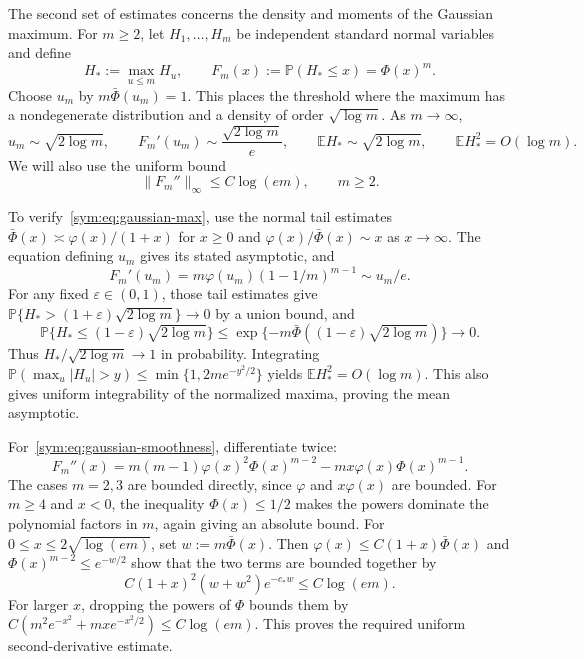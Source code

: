 \documentclass[11pt,letterpaper]{article}
\theoremstyle{remark}
\newcommand{\E}{\mathbb E}
\newcommand{\Pp}{\mathbb P}
\begin{document}
The second set of estimates concerns the density and moments of
the Gaussian maximum. For $m\ge2$, let $H_1,\ldots,H_m$ be
independent standard normal variables and define
\[
 H_*:=\max_{u\le m}H_u,\qquad F_m(x):=\Pp(H_*\le x)=\Phi(x)^m.
\]
Choose $u_m$ by $m\bar\Phi(u_m)=1$. This places the threshold
where the maximum has a nondegenerate distribution and a density
of order $\sqrt{\log m}$. As $m\to\infty$,
\begin{equation}
 u_m\sim\sqrt{2\log m},\qquad
 F_m'(u_m)\sim\frac{\sqrt{2\log m}}e,\qquad
 \E H_*\sim\sqrt{2\log m},\qquad \E H_*^2=O(\log m).
 \label{sym:eq:gaussian-max}
\end{equation}
We will also use the uniform bound
\begin{equation}
 \|F_m''\|_\infty\le C\log(em),\qquad m\ge2.
 \label{sym:eq:gaussian-smoothness}
\end{equation}

To verify~\eqref{sym:eq:gaussian-max}, use the normal tail estimates
$\bar\Phi(x)\asymp\varphi(x)/(1+x)$ for $x\ge0$ and
$\varphi(x)/\bar\Phi(x)\sim x$ as $x\to\infty$.
The equation defining $u_m$ gives its stated asymptotic, and
\[
 F_m'(u_m)=m\varphi(u_m)(1-1/m)^{m-1}
          \sim u_m/e.
\]
For any fixed $\varepsilon\in(0,1)$, those tail estimates
give $\Pp\{H_*>(1+\varepsilon)\sqrt{2\log m}\}\to0$ by a
union bound, and
\[
 \Pp\{H_*\le(1-\varepsilon)\sqrt{2\log m}\}
 \le\exp\{-m\bar\Phi((1-\varepsilon)\sqrt{2\log m})\}
 \longrightarrow0.
\]
Thus $H_*/\sqrt{2\log m}\to1$ in probability. Integrating
$\Pp(\max_u|H_u|>y)\le\min\{1,2me^{-y^2/2}\}$ yields
$\E H_*^2=O(\log m)$. This also gives uniform integrability
of the normalized maxima, proving the mean asymptotic.

For~\eqref{sym:eq:gaussian-smoothness}, differentiate twice:
\[
 F_m''(x)=m(m-1)\varphi(x)^2\Phi(x)^{m-2}
             -mx\varphi(x)\Phi(x)^{m-1}.
\]
The cases $m=2,3$ are bounded directly, since $\varphi$ and
$x\varphi(x)$ are bounded. For $m\ge4$ and $x<0$, the
inequality $\Phi(x)\le1/2$ makes the powers dominate the
polynomial factors in $m$, again giving an absolute bound.
For $0\le x\le2\sqrt{\log(em)}$, set $w:=m\bar\Phi(x)$.
Then $\varphi(x)\le C(1+x)\bar\Phi(x)$ and
$\Phi(x)^{m-2}\le e^{-w/2}$ show that the two terms are
bounded together by
\[
 C(1+x)^2(w+w^2)e^{-c_*w}\le C\log(em).
\]
For larger $x$, dropping the powers of $\Phi$ bounds them by
$C(m^2e^{-x^2}+mx e^{-x^2/2})\le C\log(em)$.
This proves the required uniform second-derivative estimate.
\end{document}
